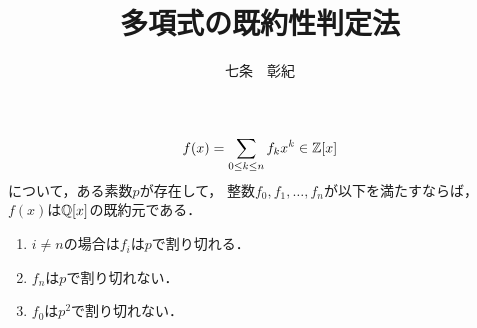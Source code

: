 \documentclass[a4j]{jsarticle}
\title{多項式の既約性判定法}
\author{七条　彰紀}
\begin{document}
\maketitle

\begin{Thm}
    \[ f(x)=\sum_{0 \leq k \leq n}{f_k x^k} \in \mathbb{Z}[x] \]
    について，ある素数$p$が存在して，
    整数$f_0, f_1, \dots, f_n$が以下を満たすならば，
    $f(x)$は$\mathbb{Q}[x]$の既約元である．
    \begin{enumerate}
        \item $i \neq n$の場合は$f_i$は$p$で割り切れる．
        \item $f_n$は$p$で割り切れない．
        \item $f_0$は$p^2$で割り切れない．
    \end{enumerate}
\end{Thm}
\end{document}
